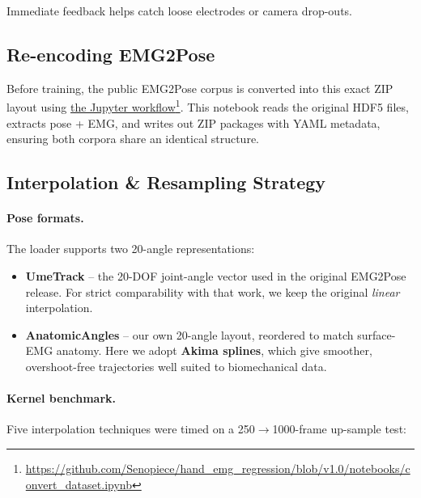 Immediate feedback helps catch loose electrodes or camera drop-outs.

\subsection{Re-encoding EMG2Pose}
Before training, the public EMG2Pose corpus is converted into this exact ZIP layout using \href{https://github.com/Senopiece/hand_emg_regression/blob/v1.0/notebooks/convert_dataset.ipynb}{the Jupyter workflow}\footnote{\url{https://github.com/Senopiece/hand_emg_regression/blob/v1.0/notebooks/convert_dataset.ipynb}}. This notebook reads the original HDF5 files, extracts pose + EMG, and writes out ZIP packages with YAML metadata, ensuring both corpora share an identical structure.

\subsection{Interpolation \& Resampling Strategy}

\paragraph{Pose formats.}
The loader supports two 20-angle representations:

\begin{itemize}
  \item \textbf{UmeTrack} -- the 20-DOF joint-angle vector used in the original
        EMG2Pose release. For strict comparability with that work, we keep the
        original \emph{linear} interpolation.
  \item \textbf{AnatomicAngles} -- our own 20-angle layout, reordered to match
        surface-EMG anatomy. Here we adopt \textbf{Akima splines}, which give
        smoother, overshoot-free trajectories well suited to biomechanical
        data.
\end{itemize}

\paragraph{Kernel benchmark.}
Five interpolation techniques were timed on a 250$\to$1000-frame up-sample test:

